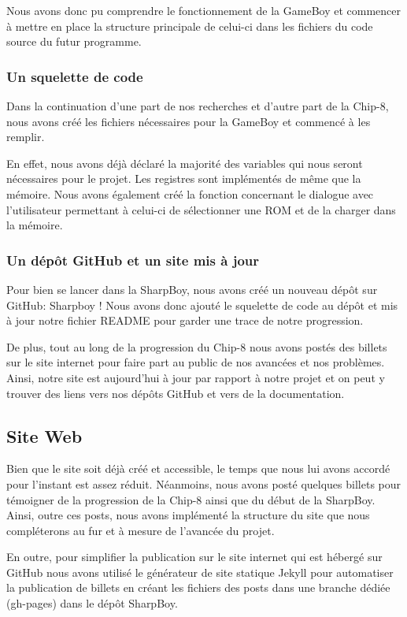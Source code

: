 \documentclass[12pt, a4paper]{article}
\begin{document}
Nous avons donc pu comprendre le fonctionnement de la GameBoy et commencer à mettre en place la structure principale de celui-ci dans les fichiers du code source du futur programme.

\subsubsection{\large Un squelette de code}
Dans la continuation d'une part de nos recherches et d'autre part de la Chip-8, nous avons créé les fichiers nécessaires pour la GameBoy et commencé à les remplir. 

En effet, nous avons déjà déclaré la majorité des variables qui nous seront nécessaires pour le projet. Les registres sont implémentés de même que la mémoire. Nous avons également créé la fonction concernant le dialogue avec l'utilisateur permettant à celui-ci de sélectionner une ROM et de la charger dans la mémoire.

\subsubsection{\large Un dépôt GitHub et un site mis à jour}

Pour bien se lancer dans la SharpBoy, nous avons créé un nouveau dépôt sur GitHub: Sharpboy ! Nous avons donc ajouté le squelette de code au dépôt et mis à jour notre fichier README pour garder une trace de notre progression. 

De plus, tout au long de la progression du Chip-8 nous avons postés des billets sur le site internet pour faire part au public de nos avancées et nos problèmes. Ainsi, notre site est aujourd'hui à jour par rapport à notre projet et on peut y trouver des liens vers nos dépôts GitHub et vers de la documentation.


\subsection{Site Web}
Bien que le site soit déjà créé et accessible, le temps que nous lui avons accordé pour l'instant est assez réduit. Néanmoins, nous avons posté quelques billets pour témoigner de la progression de la Chip-8 ainsi que du début de la SharpBoy. Ainsi, outre ces posts, nous avons implémenté la structure du site que nous compléterons au fur et à mesure de l'avancée du projet.

En outre, pour simplifier la publication sur le site internet qui est hébergé sur GitHub nous avons utilisé le générateur de site statique Jekyll pour automatiser la publication de billets en créant les fichiers des posts dans une branche dédiée (gh-pages) dans le dépôt SharpBoy.
\end{document}
